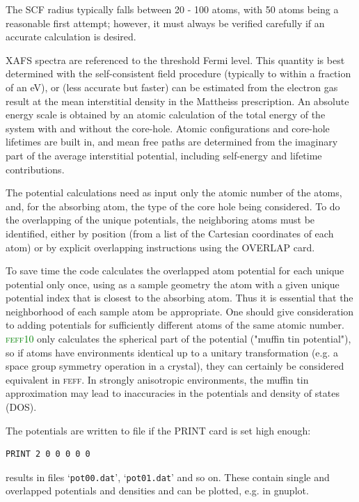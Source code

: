 \documentclass[11pt,oneside]{report} %
\newcommand{\feffcurrent}{\textsc{feff10}}
\newcommand{\program}[1]{\textsc{#1}}
\newcommand{\feff}{\program{feff}}
\newcommand{\file}[1]{`\texttt{#1}'}
\begin{document}
The SCF radius typically falls between 20 - 100 atoms, with 50 atoms being a reasonable first attempt; however, it must always be verified carefully if an accurate calculation is desired.

XAFS spectra are referenced to the threshold Fermi level. This
quantity is best determined with the self-consistent field procedure 
(typically to within a fraction of an eV), 
or (less accurate but faster) can be estimated from the electron
gas result at the mean interstitial density in the Mattheiss prescription. 
An absolute energy scale is obtained by an atomic
calculation of the total energy of the system with and without the
core-hole. Atomic configurations and core-hole lifetimes are built
in, and mean free paths are determined from the imaginary part of the
average interstitial potential, including self-energy and lifetime
contributions.

The potential calculations need as input only the atomic number of the
atoms, and, for the absorbing atom, the type of the core hole being
considered. To do the overlapping of the unique potentials, the
neighboring atoms must be identified, either by position (from a list
of the Cartesian coordinates of each atom) or by explicit overlapping
instructions using the OVERLAP card.

To save time the code calculates the overlapped atom potential for each
unique potential only once, using as a sample geometry the atom with
a given unique potential index that is closest to the absorbing atom. 
Thus it is essential that the neighborhood of each sample atom be appropriate.
One should give consideration to adding potentials for sufficiently different atoms
of the same atomic number.  \textcolor{green}{\feffcurrent} only calculates the spherical part of the potential
("muffin tin potential"), so if atoms have environments identical up to a unitary transformation
(e.g. a space group symmetry operation in a crystal), they can certainly be considered equivalent
in {\feff}.  In strongly anisotropic environments, the muffin tin approximation may lead
to inaccuracies in the potentials and density of states (DOS). 

The potentials are written to file if the PRINT card is set high enough:
\begin{verbatim}
PRINT 2 0 0 0 0 0 
\end{verbatim}
results in files \file{pot00.dat}, \file{pot01.dat} and so on.  These contain single and overlapped potentials
and densities and can be plotted, e.g. in gnuplot.
\end{document}
